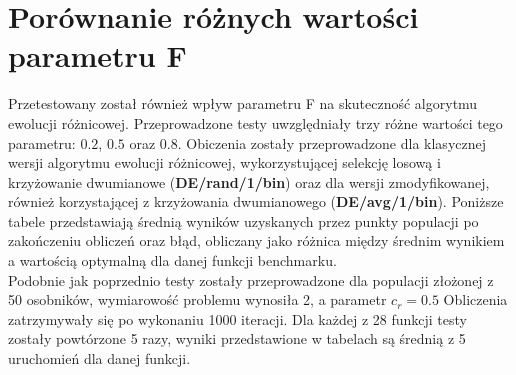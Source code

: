 \documentclass[a4paper,12pt]{article}
\theoremstyle{definition}
\begin{document}
\section{Porównanie różnych wartości parametru F}
Przetestowany został również wpływ parametru F na skuteczność algorytmu ewolucji różnicowej. Przeprowadzone testy uwzględniały trzy różne wartości tego parametru: $0.2$, $0.5$ oraz $0.8$. Obiczenia zostały przeprowadzone dla klasycznej wersji algorytmu ewolucji różnicowej, wykorzystującej selekcję losową i krzyżowanie dwumianowe (\textbf{DE/rand/1/bin}) oraz dla wersji zmodyfikowanej, również korzystającej z krzyżowania dwumianowego (\textbf{DE/avg/1/bin}). Poniższe tabele przedstawiają średnią wyników uzyskanych przez punkty populacji po zakończeniu obliczeń oraz błąd, obliczany jako różnica między średnim wynikiem a wartością optymalną dla danej funkcji benchmarku.\\

Podobnie jak poprzednio testy zostały przeprowadzone dla populacji złożonej z 50 osobników, wymiarowość problemu wynosiła 2, a parametr $c_r = 0.5$ Obliczenia zatrzymywały się po wykonaniu 1000 iteracji. Dla każdej z 28 funkcji testy zostały powtórzone 5 razy, wyniki przedstawione w tabelach są średnią z 5 uruchomień dla danej funkcji.
\end{document}
